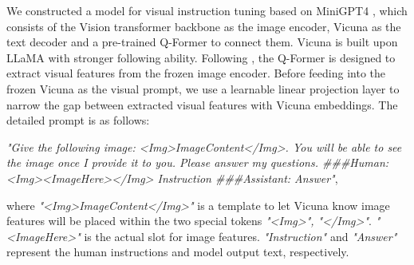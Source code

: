 \vspace{-0.1in}
We constructed a model for visual instruction tuning based on MiniGPT4 \cite{zhu2023minigpt}, which consists of the Vision transformer \cite{liu2023covid} backbone as the image encoder, Vicuna \cite{chiang2023vicuna} as the text decoder and a pre-trained Q-Former to connect them. Vicuna is built upon LLaMA \cite{touvron2023llama} with stronger following ability. Following \cite{zhu2023minigpt}, the Q-Former is designed to extract visual features from the frozen image encoder. Before feeding into the frozen Vicuna as the visual prompt, we use a learnable linear projection layer to narrow the gap between extracted visual features with Vicuna embeddings. The detailed prompt is as follows: 

\textit{"Give the following image: <Img>ImageContent</Img>. You will be able to see the image once I provide it to you. Please answer my questions. \#\#\#Human: <Img><ImageHere></Img> Instruction \#\#\#Assistant: Answer"},

where \textit{"<Img>ImageContent</Img>"} is a template to let Vicuna know image features will be placed within the two special tokens \textit{"<Img>", "</Img>"}. \textit{"<ImageHere>"} is the actual slot for image features. \textit{"Instruction"} and \textit{"Answer"} represent the human instructions and model output text, respectively.